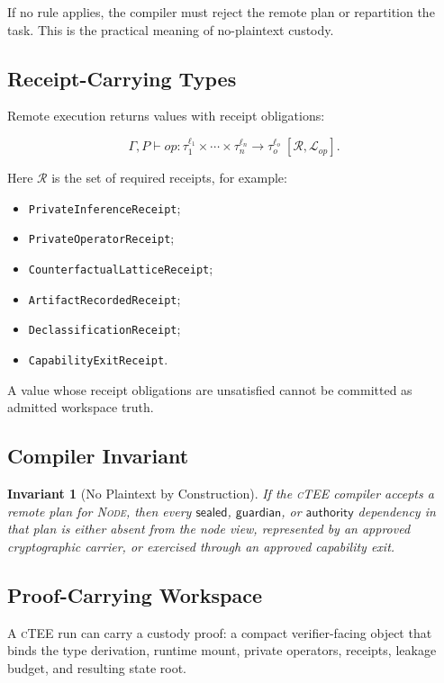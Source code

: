 \documentclass[11pt]{article}
\newtheorem{invariant}{Invariant}
\newcommand{\ctee}{\textnormal{\textsc{cTEE}}}
\newcommand{\roletext}[1]{\textnormal{\textsc{#1}}\xspace}
\newcommand{\node}{\ifmmode\mathsf{Node}\else\roletext{Node}\fi}
\newcommand{\leak}{\mathcal{L}}
\newcommand{\code}[1]{\texttt{#1}}
\begin{document}
If no rule applies, the compiler must reject the remote plan or repartition the
task. This is the practical meaning of no-plaintext custody.

\subsection{Receipt-Carrying Types}

Remote execution returns values with receipt obligations:

\[
\Gamma, P \vdash op : \tau_1^{\ell_1} \times \cdots \times \tau_n^{\ell_n}
\to \tau_o^{\ell_o} \; [\mathcal{R}, \leak_{op}].
\]

\noindent Here \(\mathcal{R}\) is the set of required receipts, for example:

\begin{itemize}[leftmargin=1.5em]
\item \code{PrivateInferenceReceipt};
\item \code{PrivateOperatorReceipt};
\item \code{CounterfactualLatticeReceipt};
\item \code{ArtifactRecordedReceipt};
\item \code{DeclassificationReceipt};
\item \code{CapabilityExitReceipt}.
\end{itemize}

A value whose receipt obligations are unsatisfied cannot be committed as
admitted workspace truth.

\subsection{Compiler Invariant}

\begin{invariant}[No Plaintext by Construction]
If the \ctee{} compiler accepts a remote plan for \node, then every
\(\mathsf{sealed}\), \(\mathsf{guardian}\), or \(\mathsf{authority}\) dependency
in that plan is either absent from the node view, represented by an approved
cryptographic carrier, or exercised through an approved capability exit.
\end{invariant}

\subsection{Proof-Carrying Workspace}

A \ctee{} run can carry a custody proof: a compact verifier-facing object that
binds the type derivation, runtime mount, private operators, receipts, leakage
budget, and resulting state root.
\end{document}
